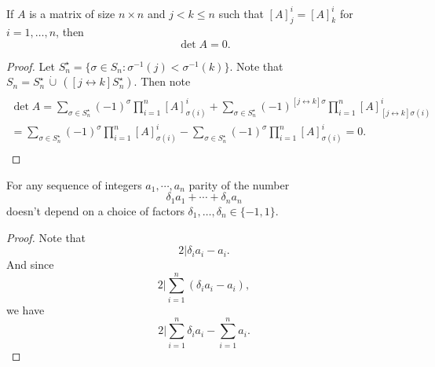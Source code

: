 \documentclass[main.tex]{subfiles}
\begin{document}
\begin{theorem}
If $A$ is a matrix of size $n \times n$ and $j < k \leq n$ such that $[A]^i_j = [A]^i_k$ for $i=1, \dots, n$, then
\begin{equation}
\det A = 0.
\end{equation}
\end{theorem}
\begin{proof}
Let $S^\star_n = \{ \sigma\in S_n: \sigma^{-1}(j) < \sigma^{-1}(k) \}$. Note that $S_n = S_n^\star \,\dot{\cup}\, ([j\leftrightarrow k]S_n^\star)$.
Then note
\begin{multline}
\\
\det A = 
\sum\limits_{\sigma\in S^\star_n} (-1)^\sigma \prod_{i=1}^n [A]^i_{\sigma(i)}
+ \sum\limits_{\sigma\in S^\star_n}(-1)^{[j\leftrightarrow k]\sigma} \prod_{i=1}^n [A]^i_{[j\leftrightarrow k]\sigma(i)}
\\ = \sum\limits_{\sigma\in S^\star_n} (-1)^\sigma \prod_{i=1}^n [A]^i_{\sigma(i)}
- \sum\limits_{\sigma\in S^\star_n} (-1)^{\sigma} \prod_{i=1}^n [A]^i_{\sigma(i)} = 0.
\\
\end{multline}
\end{proof}
\begin{lemma}
\label{parity}
For any sequence of integers $a_1, \cdots, a_n$ parity of the number
\begin{equation}
\delta_1 a_1 + \cdots + \delta_n a_n
\end{equation}
doesn't depend on a choice of factors $\delta_1, \dots, \delta_n \in \{-1, 1\}$.
\end{lemma}
\begin{proof}
Note that $$ 2 \bigg| \delta_i a_i - a_i.$$
And since 
\begin{equation}
2 \bigg| \sum_{i=1}^n (\delta_i a_i - a_i),
\end{equation}
we have
\begin{equation}
2 \bigg| \sum_{i=1}^n \delta_i a_i -  \sum_{i=1}^n a_i.
\end{equation}
\end{proof}
\end{document}
